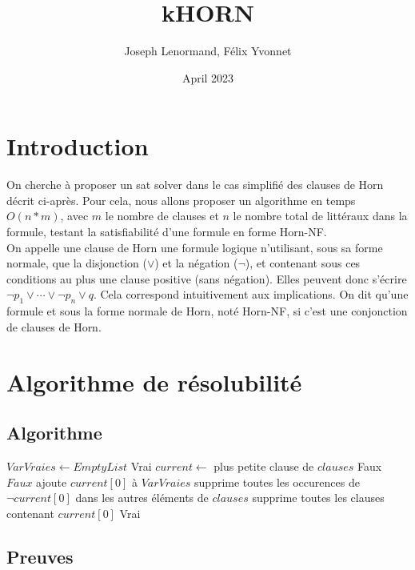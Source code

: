 \documentclass{article}
\title{kHORN}
\author{Joseph Lenormand, Félix Yvonnet}
\date{April 2023}
\begin{document}
\maketitle

\section{Introduction}
On cherche à proposer un sat solver dans le cas simplifié des clauses de Horn décrit ci-après. Pour cela, nous allons proposer un algorithme en temps $O(n*m)$, avec $m$ le nombre de clauses et $n$ le nombre total de littéraux dans la formule, testant la satisfiabilité d’une formule en forme Horn-NF.\\

On appelle une clause de Horn une formule logique n'utilisant, sous sa forme normale, que la disjonction ($\vee$) et la négation ($\neg$), et contenant sous ces conditions au plus une clause positive (sans négation). Elles peuvent donc s'écrire $\neg p_1\vee\cdots\vee\neg p_n\vee q$. Cela correspond intuitivement aux implications. On dit qu'une formule et sous la forme normale de Horn, noté Horn-NF, si c'est une conjonction de clauses de Horn.

\section{Algorithme de résolubilité}
\subsection{Algorithme}
\begin{algorithmic}
    \State $VarVraies\gets EmptyList$
    \Loop
            \State \Return Vrai
        \EndIf
        \State $current\gets$ plus petite clause de $clauses$
            \State \Return Faux
                \State \Return $Faux$
            \Else
                \State ajoute $current[0]$ à $VarVraies$
                \State supprime toutes les occurences de $\neg current[0]$ dans les autres éléments de $clauses$
                \State supprime toutes les clauses contenant $current[0]$
            \EndIf
        \Else 
            \State \Return Vrai
        \EndIf
    \EndLoop
\EndFunction
\end{algorithmic}

\subsection{Preuves}
\end{document}
